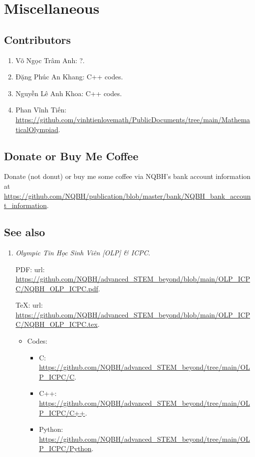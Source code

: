 \documentclass{article}
\begin{document}

\section{Miscellaneous}

\subsection{Contributors}

\begin{enumerate}
	\item {\sc Võ Ngọc Trâm Anh}: ?.
	\item {\sc Đặng Phúc An Khang}: C++ codes.
	\item {\sc Nguyễn Lê Anh Khoa}: C++ codes.
	\item {\sc Phan Vĩnh Tiến}: \url{https://github.com/vinhtienlovemath/PublicDocuments/tree/main/MathematicalOlympiad}.
\end{enumerate}

\subsection{Donate or Buy Me Coffee}
Donate (not donut) or buy me some coffee via NQBH's bank account information at \url{https://github.com/NQBH/publication/blob/master/bank/NQBH_bank_account_information}.

\subsection{See also}

\begin{enumerate}
	\item {\it Olympic Tin Học Sinh Viên [OLP] \& ICPC}.
	
	PDF: {\sc url}: \url{https://github.com/NQBH/advanced_STEM_beyond/blob/main/OLP_ICPC/NQBH_OLP_ICPC.pdf}.
	
	\TeX: {\sc url}: \url{https://github.com/NQBH/advanced_STEM_beyond/blob/main/OLP_ICPC/NQBH_OLP_ICPC.tex}.
	\begin{itemize}
		\item Codes:
		\begin{itemize}
			\item C: \url{https://github.com/NQBH/advanced_STEM_beyond/tree/main/OLP_ICPC/C}.
			\item C++: \url{https://github.com/NQBH/advanced_STEM_beyond/tree/main/OLP_ICPC/C++}.
			\item Python: \url{https://github.com/NQBH/advanced_STEM_beyond/tree/main/OLP_ICPC/Python}.
		\end{itemize}
	\end{itemize}
\end{enumerate}


\printbibliography[heading=bibintoc]
	
\end{document}
